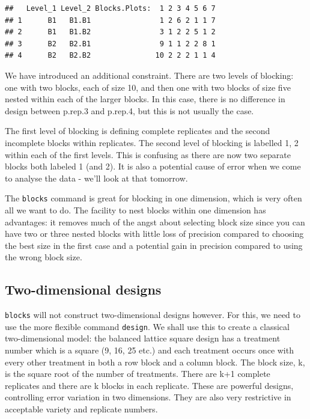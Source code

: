 \documentclass[
]{book}
\begin{document}
\begin{verbatim}
##   Level_1 Level_2 Blocks.Plots:  1 2 3 4 5 6 7
## 1      B1   B1.B1                1 2 6 2 1 1 7
## 2      B1   B1.B2                3 1 2 2 5 1 2
## 3      B2   B2.B1                9 1 1 2 2 8 1
## 4      B2   B2.B2               10 2 2 2 1 1 4
\end{verbatim}

We have introduced an additional constraint. There are two levels of blocking: one with two blocks, each of size 10, and then one with two blocks of size five nested within each of the larger blocks. In this case, there is no difference in design between p.rep.3 and p.rep.4, but this is not usually the case.

The first level of blocking is defining complete replicates and the second incomplete blocks within replicates. The second level of blocking is labelled 1, 2 within each of the first levels. This is confusing as there are now two separate blocks both labeled 1 (and 2). It is also a potential cause of error when we come to analyse the data - we'll look at that tomorrow.

The \texttt{blocks} command is great for blocking in one dimension, which is very often all we want to do. The facility to nest blocks within one dimension has advantages: it removes much of the angst about selecting block size since you can have two or three nested blocks with little loss of precision compared to choosing the best size in the first case and a potential gain in precision compared to using the wrong block size.

\hypertarget{two-dimensional-designs}{%
\subsection{Two-dimensional designs}\label{two-dimensional-designs}}

\texttt{blocks} will not construct two-dimensional designs however. For this, we need to use the more flexible command \texttt{design}. We shall use this to create a classical two-dimensional model: the balanced lattice square design has a treatment number which is a square (9, 16, 25 etc.) and each treatment occurs once with every other treatment in both a row block and a column block. The block size, k, is the square root of the number of treatments. There are k+1 complete replicates and there are k blocks in each replicate. These are powerful designs, controlling error variation in two dimensions. They are also very restrictive in acceptable variety and replicate numbers.
\end{document}
